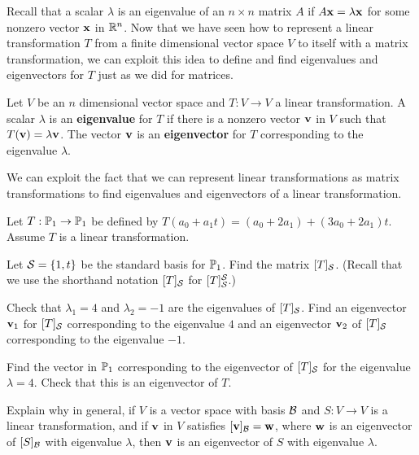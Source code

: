 

Recall that a scalar $\lambda$ is an eigenvalue of an $n \times n$ matrix $A$ if $A \mathbf{x} = \lambda \mathbf{x}$ for some nonzero vector $\mathbf{x}$ in $\mathbb{R}^n$. Now that we have seen how to represent a linear transformation $T$ from a finite dimensional vector space $V$ to itself with a matrix transformation, we can exploit this idea to define and find eigenvalues and eigenvectors for $T$ just as we did for matrices.

\begin{definition} Let $V$ be an $n$ dimensional vector space and $T : V \to V$ a linear transformation. A scalar $\lambda$ is an \textbf{eigenvalue} for $T$ if there is a nonzero vector $\mathbf{v}$ in $V$ such that $T(\mathbf{v}) = \lambda \mathbf{v}$. The vector $\mathbf{v}$ is an \textbf{eigenvector} for $T$ corresponding to the eigenvalue $\lambda$.
\end{definition}

We can exploit the fact that we can represent linear transformations as matrix transformations to find eigenvalues and eigenvectors of a linear transformation. 

\begin{pa} \label{pa:8_c} Let $T: \mathbb{P}_1 \to \mathbb{P}_1$ be defined by $T(a_0+a_1t) = (a_0+2a_1) + (3a_0+2a_1)t$. Assume $T$ is a linear transformation.
	\be
	\item Let $\mathcal{S} = \{1,t\}$ be the standard basis for $\mathbb{P}_1$. Find the matrix $[T]_{\mathcal{S}}$. (Recall that we use the shorthand notation $[T]_{\mathcal{S}}$ for $[T]_{\mathcal{S}}^{\mathcal{S}}$.)

	
	\item Check that $\lambda_1 = 4$ and $\lambda_2 = -1$ are the eigenvalues of $[T]_{\mathcal{S}}$. Find an eigenvector $\mathbf{v}_1$ for $[T]_{\mathcal{S}}$ corresponding to the eigenvalue $4$ and an eigenvector $\mathbf{v}_2$ of $[T]_{\mathcal{S}}$ corresponding to the eigenvalue $-1$.

	\item Find the vector in $\mathbb{P}_1$ corresponding to the eigenvector of $[T]_{\mathcal{S}}$ for the eigenvalue $\lambda=4$. Check that this is an eigenvector of $T$.
	

	\item Explain why in general, if $V$ is a vector space with basis $\mathcal{B}$ and $S: V \to V$ is a linear transformation, and if $\mathbf{v}$ in $V$ satisfies $[\mathbf{v}]_{\mathcal{B}}=\mathbf{w}$, where $\mathbf{w}$ is an eigenvector of $[S]_{\mathcal{B}}$ with eigenvalue $\lambda$, then $\mathbf{v}$ is an eigenvector of $S$ with eigenvalue $\lambda$.

	
	\ee

\end{pa}

